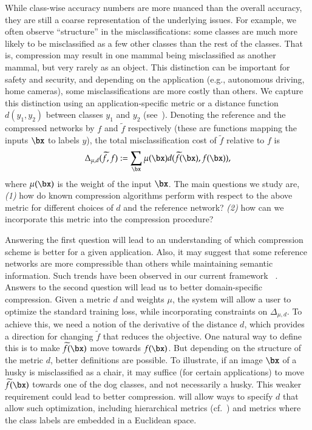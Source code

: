 While class-wise accuracy numbers are more nuanced than the overall accuracy, they are still a coarse representation of the underlying issues. For example, we often observe ``structure'' in the misclassifications: some classes are much more likely to be misclassified as a few other classes than the rest of the classes.  That is, compression may result in one mammal being misclassified as another mammal, but very rarely as an object. This distinction can be important for safety and security, and depending on the application (e.g., autonomous driving, home cameras), some misclassifications are more costly than others. We capture this distinction using an application-specific metric or a distance function $d(y_1,y_2)$ between classes $y_1$ and $y_2$ (see~\cite{qin2018verification}). Denoting the reference and the compressed networks by $f$ and $\widetilde{f}$ respectively (these are functions mapping the inputs $\bx$ to labels $y$), the total misclassification cost of $\widetilde{f}$ relative to $f$ is
\[ \Delta_{\mu, d}(\widetilde{f}, f) :=  \sum_{\bx} \mu (\bx) d(\widetilde{f}(\bx), f(\bx)),\]
where $\mu(\bx)$ is the weight of the input $\bx$.  The main questions we study are, \textit{(1)} how do known compression algorithms perform with respect to the above metric for different choices of $d$ and the reference network? \textit{(2)} how can we incorporate this metric into the compression procedure?\label{tmc-measure}
%

Answering the first question will lead to an understanding of which compression scheme is better for a given application. Also, it may suggest that some reference networks are more compressible than others while maintaining semantic information. Such trends have been observed in our current framework \condensa{}~\cite{joseph2019programmable}. 
%
Answers to the second question will lead us to
better domain-specific compression. 
%
Given a metric $d$ and weights $\mu$, the \ardent{} system will allow a user to optimize the standard training loss, while incorporating constraints on $\Delta_{\mu, d}$.  To achieve this, we need a notion of the derivative of the distance $d$, which provides a direction for changing $\widetilde{f}$ that reduces the objective. One natural way to define this is to make $\widetilde{f}(\bx)$ move towards $f(\bx)$.  But depending on the structure of the metric $d$, better definitions are possible. To illustrate, if an image $\bx$ of a husky is misclassified as a chair, it may suffice (for certain applications) to move $\widetilde{f}(\bx)$ towards one of the dog classes, and not necessarily a husky. This weaker requirement could lead to better compression.  \ardent{} will allow ways to specify $d$ that allow such optimization, including hierarchical metrics (cf.~\cite{Babenko2009SimilarityMF,Bengio2010Label}) and metrics 
where the class labels are embedded in a Euclidean space.\label{hier-metrics}

